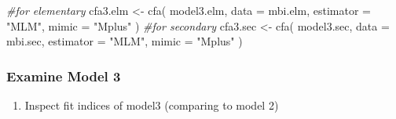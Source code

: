 \documentclass[
]{article}
\newenvironment{Shaded}{\begin{snugshade}}{\end{snugshade}}
\newcommand{\AttributeTok}[1]{\textcolor[rgb]{0.77,0.63,0.00}{#1}}
\newcommand{\CommentTok}[1]{\textcolor[rgb]{0.56,0.35,0.01}{\textit{#1}}}
\newcommand{\FunctionTok}[1]{\textcolor[rgb]{0.00,0.00,0.00}{#1}}
\newcommand{\NormalTok}[1]{#1}
\newcommand{\OtherTok}[1]{\textcolor[rgb]{0.56,0.35,0.01}{#1}}
\newcommand{\StringTok}[1]{\textcolor[rgb]{0.31,0.60,0.02}{#1}}
\providecommand{\tightlist}{%
  \setlength{\itemsep}{0pt}\setlength{\parskip}{0pt}}
\begin{document}
\begin{Shaded}
\begin{Highlighting}[]
\CommentTok{\#for elementary}
\NormalTok{cfa3.elm }\OtherTok{\textless{}{-}} 
  \FunctionTok{cfa}\NormalTok{(}
\NormalTok{    model3.elm, }
    \AttributeTok{data =}\NormalTok{ mbi.elm,  }
    \AttributeTok{estimator =} \StringTok{"MLM"}\NormalTok{,}
    \AttributeTok{mimic =} \StringTok{"Mplus"}
\NormalTok{    )}
\CommentTok{\#for secondary}
\NormalTok{cfa3.sec }\OtherTok{\textless{}{-}} 
  \FunctionTok{cfa}\NormalTok{(}
\NormalTok{    model3.sec, }
    \AttributeTok{data =}\NormalTok{ mbi.sec,  }
    \AttributeTok{estimator =} \StringTok{"MLM"}\NormalTok{,}
    \AttributeTok{mimic =} \StringTok{"Mplus"}
\NormalTok{    )}
\end{Highlighting}
\end{Shaded}

\hypertarget{examine-model-3}{%
\subsubsection{Examine Model 3}\label{examine-model-3}}

\begin{enumerate}
\def\labelenumi{(\arabic{enumi})}
\tightlist
\item
  Inspect fit indices of model3 (comparing to model 2)
\end{enumerate}
\end{document}
